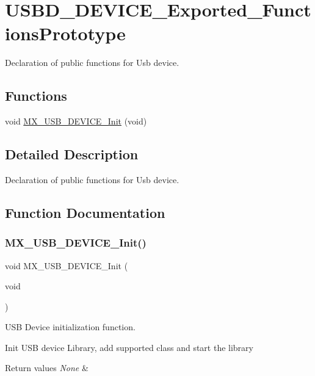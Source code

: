 \hypertarget{group__USBD__DEVICE__Exported__FunctionsPrototype}{}\section{U\+S\+B\+D\+\_\+\+D\+E\+V\+I\+C\+E\+\_\+\+Exported\+\_\+\+Functions\+Prototype}
\label{group__USBD__DEVICE__Exported__FunctionsPrototype}


Declaration of public functions for Usb device.  


\subsection*{Functions}
\begin{DoxyCompactItemize}
\item 
void \hyperlink{group__USBD__DEVICE__Exported__FunctionsPrototype_gadab4f7fc1db4ce2be073d3913209d2af}{M\+X\+\_\+\+U\+S\+B\+\_\+\+D\+E\+V\+I\+C\+E\+\_\+\+Init} (void)
\end{DoxyCompactItemize}


\subsection{Detailed Description}
Declaration of public functions for Usb device. 



\subsection{Function Documentation}
\mbox{\label{group__USBD__DEVICE__Exported__FunctionsPrototype_gadab4f7fc1db4ce2be073d3913209d2af}} 
\subsubsection{\texorpdfstring{M\+X\+\_\+\+U\+S\+B\+\_\+\+D\+E\+V\+I\+C\+E\+\_\+\+Init()}{MX\_USB\_DEVICE\_Init()}}
{\footnotesize\ttfamily void M\+X\+\_\+\+U\+S\+B\+\_\+\+D\+E\+V\+I\+C\+E\+\_\+\+Init (\begin{DoxyParamCaption}\item[{void}]{ }\end{DoxyParamCaption})}

U\+SB Device initialization function.

Init U\+SB device Library, add supported class and start the library 
\begin{DoxyRetVals}{Return values}
{\em None} & \\
\hline
\end{DoxyRetVals}
